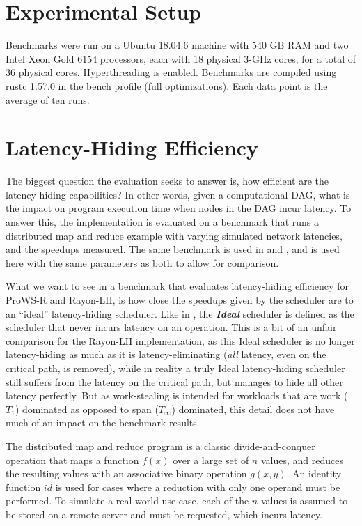 \documentclass[bsc,frontabs,singlespacing,parskip,deptreport,normalheadings]{infthesis}
\begin{document}
\section{Experimental Setup}
\label{section:experimental_setup}

Benchmarks were run on a Ubuntu 18.04.6 machine with 540 GB RAM and two Intel
Xeon Gold 6154 processors, each with 18 physical 3-GHz cores, for a total of 36
physical cores. Hyperthreading is enabled. Benchmarks are compiled using rustc
1.57.0 in the bench profile (full optimizations). Each data point is the average
of ten runs.

\section{Latency-Hiding Efficiency}
\label{section:latency-hiding_efficiency}

The biggest question the evaluation seeks to answer is, how efficient are the
latency-hiding capabilities? In other words, given a computational DAG, what is
the impact on program execution time when nodes in the DAG incur latency. To
answer this, the implementation is evaluated on a benchmark that runs a
distributed map and reduce example with varying simulated network latencies, and the
speedups measured. The same benchmark is used in
\cite{muller_latency-hiding_2016} and \cite{singer_scheduling_2019}, and is used
here with the same parameters as both to allow for comparison.

What we want to see in a benchmark that evaluates latency-hiding efficiency for
ProWS-R and Rayon-LH, is how close the speedups given by the scheduler are to an
``ideal'' latency-hiding scheduler. Like in \cite{singer_scheduling_2019}, the
\textit{\textbf{Ideal}} scheduler is defined as the scheduler that never incurs
latency on an operation. This is a bit of an unfair comparison for the Rayon-LH
implementation, as this Ideal scheduler is no longer latency-hiding as much as
it is latency-eliminating (\textit{all} latency, even on the critical path, is
removed), while in reality a truly Ideal latency-hiding scheduler still suffers
from the latency on the critical path, but manages to hide all other latency
perfectly. But as work-stealing is intended for workloads that are work
(\(T_1\)) dominated as opposed to span (\(T_\infty\)) dominated, this detail
does not have much of an impact on the benchmark results.

The distributed map and reduce program is a classic divide-and-conquer operation
that maps a function \(f(x)\) over a large set of \(n\) values, and reduces the
resulting values with an associative binary operation \(g(x,y)\). An identity
function \(id\) is used for cases where a reduction with only one operand must
be performed. To simulate a real-world use case, each of the \(n\) values is
assumed to be stored on a remote server and must be requested, which incurs
latency.
\end{document}
